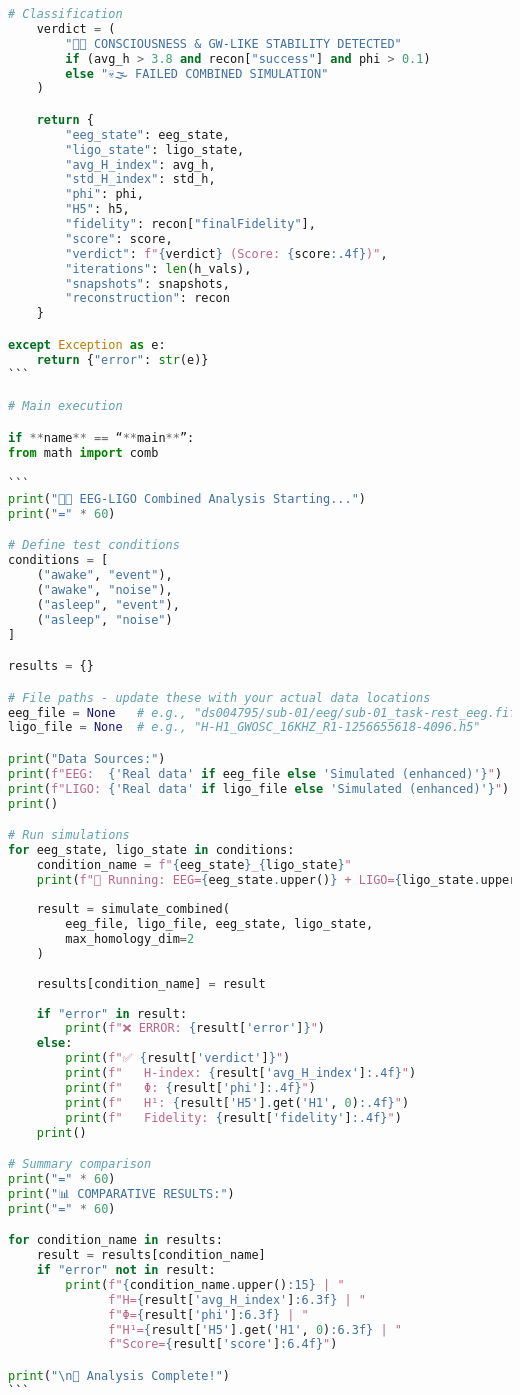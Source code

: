 \documentclass[11pt]{article}
\begin{document}
\begin{lstlisting}[language=Python, caption={EEG-LIGO Combined Analysis - Complete Code}]
    # Classification
    verdict = (
        "🧠🌌 CONSCIOUSNESS & GW-LIKE STABILITY DETECTED" 
        if (avg_h > 3.8 and recon["success"] and phi > 0.1)
        else "💀🌫️ FAILED COMBINED SIMULATION"
    )

    return {
        "eeg_state": eeg_state,
        "ligo_state": ligo_state,
        "avg_H_index": avg_h,
        "std_H_index": std_h,
        "phi": phi,
        "H5": h5,
        "fidelity": recon["finalFidelity"],
        "score": score,
        "verdict": f"{verdict} (Score: {score:.4f})",
        "iterations": len(h_vals),
        "snapshots": snapshots,
        "reconstruction": recon
    }

except Exception as e:
    return {"error": str(e)}
```

# Main execution

if **name** == “**main**”:
from math import comb

```
print("🧠🌌 EEG-LIGO Combined Analysis Starting...")
print("=" * 60)

# Define test conditions
conditions = [
    ("awake", "event"),
    ("awake", "noise"),
    ("asleep", "event"),
    ("asleep", "noise")
]

results = {}

# File paths - update these with your actual data locations
eeg_file = None   # e.g., "ds004795/sub-01/eeg/sub-01_task-rest_eeg.fif"
ligo_file = None  # e.g., "H-H1_GWOSC_16KHZ_R1-1256655618-4096.h5"

print("Data Sources:")
print(f"EEG:  {'Real data' if eeg_file else 'Simulated (enhanced)'}")
print(f"LIGO: {'Real data' if ligo_file else 'Simulated (enhanced)'}")
print()

# Run simulations
for eeg_state, ligo_state in conditions:
    condition_name = f"{eeg_state}_{ligo_state}"
    print(f"🔄 Running: EEG={eeg_state.upper()} + LIGO={ligo_state.upper()}")
    
    result = simulate_combined(
        eeg_file, ligo_file, eeg_state, ligo_state, 
        max_homology_dim=2
    )
    
    results[condition_name] = result
    
    if "error" in result:
        print(f"❌ ERROR: {result['error']}")
    else:
        print(f"✅ {result['verdict']}")
        print(f"   H-index: {result['avg_H_index']:.4f}")
        print(f"   Φ: {result['phi']:.4f}")
        print(f"   H¹: {result['H5'].get('H1', 0):.4f}")
        print(f"   Fidelity: {result['fidelity']:.4f}")
    print()

# Summary comparison
print("=" * 60)
print("📊 COMPARATIVE RESULTS:")
print("=" * 60)

for condition_name in results:
    result = results[condition_name]
    if "error" not in result:
        print(f"{condition_name.upper():15} | "
              f"H={result['avg_H_index']:6.3f} | "
              f"Φ={result['phi']:6.3f} | "
              f"H¹={result['H5'].get('H1', 0):6.3f} | "
              f"Score={result['score']:6.4f}")

print("\n🎯 Analysis Complete!")
```

\end{lstlisting}
\end{document}
